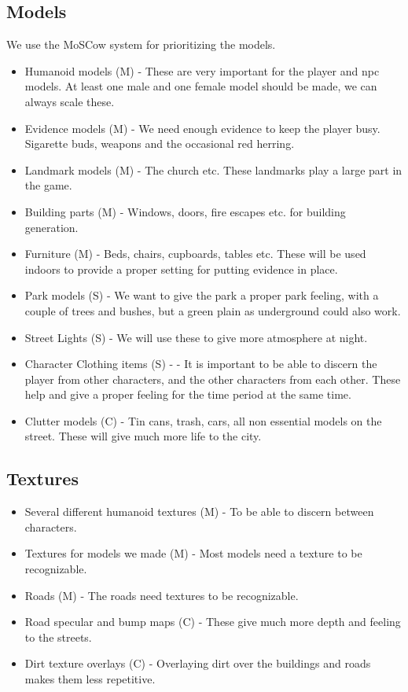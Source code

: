 \documentclass{article}
\begin{document}
	\subsection{Models}
		We use the MoSCow system for prioritizing the models.
	\begin{itemize}
		\item Humanoid models (M) - These are very important for the player and npc models. At least one male and one female model should be made, we can always scale these.
		\item Evidence models (M) - We need enough evidence to keep the player busy. Sigarette buds, weapons and the occasional red herring.
		\item Landmark models (M) - The church etc. These landmarks play a large part in the game.
		\item Building parts (M) - Windows, doors, fire escapes etc. for building generation.
		\item Furniture (M) - Beds, chairs, cupboards, tables etc. These will be used indoors to provide a proper setting for putting evidence in place.
		\item Park models (S) - We want to give the park a proper park feeling, with a couple of trees and bushes, but a green plain as underground could also work.
		\item Street Lights (S) - We will use these to give more atmosphere at night.
		\item Character Clothing items (S) -  - It is important to be able to discern the player from other characters, and the other characters from each other. These help and give a proper feeling for the time period at the same time.
		\item Clutter models (C) - Tin cans, trash, cars, all non essential models on the street. These will give much more life to the city.

	\end{itemize}

	\subsection{Textures}
		\begin{itemize}
			\item Several different humanoid textures (M) - To be able to discern between characters.
			\item Textures for models we made (M) - Most models need a texture to be recognizable.
			\item Roads (M) - The roads need textures to be recognizable.
			\item Road specular and bump maps (C) - These give much more depth and feeling to the streets.
			\item Dirt texture overlays (C) - Overlaying dirt over the buildings and roads makes them less repetitive.
		\end{itemize}
\end{document}
